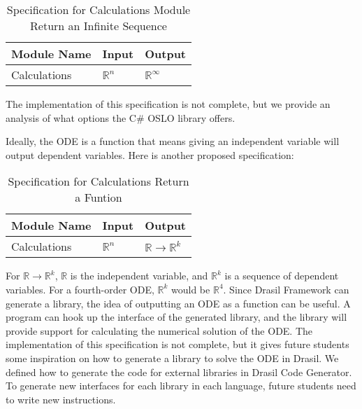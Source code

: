 \begin{table}[ht]
\centering
\begin{tabular}{p{} | p{} | p{}} \hline
    \textbf{Module Name}&\textbf{Input}&\textbf{Output}\\
    \toprule
    Calculations & $\mathbb{R}^n$ & $\mathbb{R}^{\infty}$ \\
    \bottomrule	
\end{tabular}	
\caption{Specification for Calculations Module Return an Infinite Sequence}	
\label{tab_srsforcal}
\end{table}
The implementation of this specification is not complete, but we provide an analysis of what options the C\# OSLO library offers.

Ideally, the ODE is a function that means giving an independent variable will output dependent variables. Here is another proposed specification:
\begin{table}[ht]
\centering
\begin{tabular}{p{} | p{} | p{}} \hline
    \textbf{Module Name}&\textbf{Input}&\textbf{Output}\\
    \toprule
    Calculations & $\mathbb{R}^n$ & $\mathbb{R} \rightarrow \mathbb{R}^k$ \\
    \bottomrule	
\end{tabular}	
\caption{Specification for Calculations Return a Funtion}	
\label{tab_srsforcal}
\end{table}

For $\mathbb{R} \rightarrow \mathbb{R}^k$, $\mathbb{R}$ is the independent variable, and $\mathbb{R}^k$ is a sequence of dependent variables. For a fourth-order ODE, $\mathbb{R}^k$ would be $\mathbb{R}^4$. Since Drasil Framework can generate a library, the idea of outputting an ODE as a function can be useful. A program can hook up the interface of the generated library, and the library will provide support for calculating the numerical solution of the ODE. The implementation of this specification is not complete, but it gives future students some inspiration on how to generate a library to solve the ODE in Drasil. We defined how to generate the code for external libraries in Drasil Code Generator. To generate new interfaces for each library in each language, future students need to write new instructions. 
